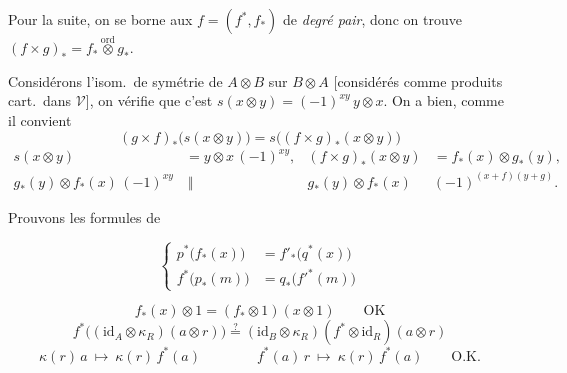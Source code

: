 \documentclass[11pt,a4paper]{article}
\begin{document}
Pour la suite, on se borne aux $f = (f^{*}, f_{*})$ de \emph{degré pair},
donc on trouve $(f \times g)_{*} = f_{*} \overset{\mathrm{ord}}{\otimes} g_{*}$.

Considérons l'isom.\ de symétrie de $A \otimes B$ sur $B \otimes A$
[considérés comme produits cart.\ dans $\mathcal{V}$], on vérifie que c'est
$s(x \otimes y) = (-1)^{xy}\, y \otimes x$. On a bien, comme il convient
\[
(g \times f)_{*}\bigl(s(x \otimes y)\bigr) = s\bigl((f \times g)_{*}(x \otimes y)\bigr)
\]
\[
\begin{aligned}
s(x \otimes y) &= y \otimes x\,(-1)^{xy}, & (f \times g)_{*}(x \otimes y) &= f_{*}(x) \otimes g_{*}(y), \\
g_{*}(y) \otimes f_{*}(x)\,(-1)^{xy} &\ \Vert & g_{*}(y) \otimes f_{*}(x)\,&(-1)^{(x+f)(y+g)} .
\end{aligned}
\]

Prouvons les formules de 


\[
\left\{
\begin{aligned}
p^{*}\bigl(f_{*}(x)\bigr) &= f'_{*}\bigl(q^{*}(x)\bigr) \\
f^{*}\bigl(p_{*}(m)\bigr) &= q_{*}\bigl(f'^{*}(m)\bigr)
\end{aligned}
\right.
\]



\[ f_{*}(x) \otimes 1 = (f_{*} \otimes 1)(x \otimes 1) \qquad \text{OK} \]
\[
f^{*}\bigl((\mathrm{id}_{A} \otimes \kappa_{R})(a \otimes r)\bigr) \overset{?}{=} (\mathrm{id}_{B} \otimes \kappa_{R})(f^{*} \otimes \mathrm{id}_{R})(a \otimes r)
\]
\[
\kappa(r)\, a \ \mapsto\ \kappa(r)\, f^{*}(a) \qquad\qquad f^{*}(a)\, r \ \mapsto\ \kappa(r)\, f^{*}(a) \qquad \text{O.K.}
\]
\end{document}
